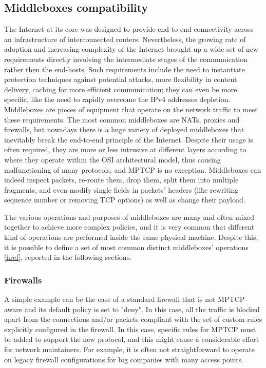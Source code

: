\subsection{Middleboxes compatibility}
The Internet at its core was designed to provide end-to-end connectivity across an infrastructure of interconnected routers. Nevertheless, the growing rate of adoption and increasing complexity of the Internet brought up a wide set of new requirements directly involving the intermediate stages of the communication rather then the end-hosts. Such requirements include the need to instantiate protection techniques against potential attacks, more flexibility in content delivery, caching for more efficient communication; they can even be more specific, like the need to rapidly overcome the IPv4 addresses depletion. Middleboxes are pieces of equipment that operate on the network traffic to meet these requirements. The most common middleboxes are NATs, proxies and firewalls, but nowadays there is a huge variety of deployed middleboxes that inevitably break the end-to-end principle of the Internet. Despite their usage is often required, they are more or less intrusive at different layers according to where they operate within the OSI architectural model, thus causing malfunctioning of many protocols, and MPTCP is no exception. Middleboxes can indeed inspect packets, re-route them, drop them, split them into multiple fragments, and even modify single fields in packets' headers (like rewriting sequence number or removing TCP options) as well as change their payload.

The various operations and purposes of middleboxes are many and often mixed together to achieve more complex policies, and it is very common that different kind of operations are performed inside the same physical machine. Despite this, it is possible to define a set of most common distinct middleboxes' operations [\href{https://queue.acm.org/detail.cfm?id=2591369}{href}], reported in the following sections.

\subsubsection{Firewalls}
A simple example can be the case of a standard firewall that is not MPTCP-aware and its default policy is set to "deny". In this case, all the traffic is blocked apart from the connections and/or packets compliant with the set of custom rules explicitly configured in the firewall. In this case, specific rules for MPTCP must be added to support the new protocol, and this might cause a considerable effort for network maintainers. For example, it is often not straightforward to operate on legacy firewall configurations for big companies with many access points.

